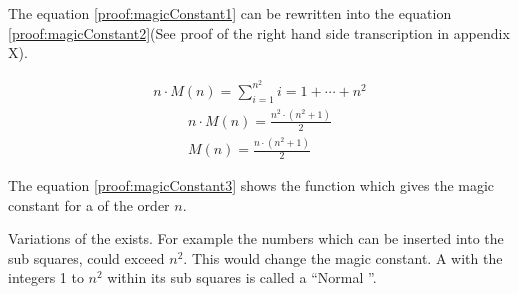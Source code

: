 The equation \ref{proof:magicConstant1} can be rewritten into the equation \ref{proof:magicConstant2}(See proof of the right hand side transcription in appendix X).

\begin{align}
\label{proof:magicConstant1}
	n \cdot M \left( n \right) = \sum ^{n^2}_{i = 1} i = 1 + \cdots + n^2
\end{align}
\begin{align}
\label{proof:magicConstant2}
	n \cdot M \left( n \right) = \frac{n^2 \cdot \left( n^2 + 1 \right)}{2} \\
\label{proof:magicConstant3}
	M \left( n \right) = \frac{n \cdot \left( n^2 + 1 \right)}{2} 
\end{align}

The equation \ref{proof:magicConstant3} shows the function which gives the magic constant for a \msquare{} of the order $n$.

Variations of the \msquare{} exists. For example the numbers which can be inserted into the sub squares, could exceed $n^2$. This would change the magic constant. A \msquare with the integers 1 to $n^2$ within its sub squares is called a ``Normal \msquare''.